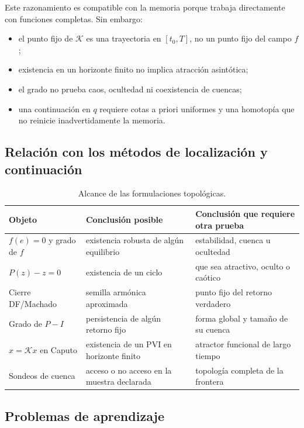 Este razonamiento es compatible con la memoria porque trabaja directamente
con funciones completas. Sin embargo:

\begin{itemize}
 \item el punto fijo de $\mathcal K$ es una trayectoria en $[t_0,T]$, no un
 punto fijo del campo $f$;
 \item existencia en un horizonte finito no implica atracción asintótica;
 \item el grado no prueba caos, ocultedad ni coexistencia de cuencas;
 \item una continuación en $q$ requiere cotas a priori uniformes y una
 homotopía que no reinicie inadvertidamente la memoria.
\end{itemize}

\subsection{Relación con los métodos de localización y continuación}

\begin{table}[H]
\centering
\caption{Alcance de las formulaciones topológicas.}
\label{tab:topological-method-boundary}
\small
\begin{tabularx}{\textwidth}{@{}L{3.0cm}YY@{}}
\toprule
Objeto & Conclusión posible & Conclusión que requiere otra prueba \\
\midrule
$f(e)=0$ y grado de $f$ & existencia robusta de algún equilibrio & estabilidad, cuenca u ocultedad \\
$P(z)-z=0$ & existencia de un ciclo & que sea atractivo, oculto o caótico \\
Cierre DF/Machado & semilla armónica aproximada & punto fijo del retorno verdadero \\
Grado de $P-I$ & persistencia de algún retorno fijo & forma global y tamaño de su cuenca \\
$x=\mathcal Kx$ en Caputo & existencia de un PVI en horizonte finito & atractor funcional de largo tiempo \\
Sondeos de cuenca & acceso o no acceso en la muestra declarada & topología completa de la frontera \\
\bottomrule
\end{tabularx}
\end{table}

\ifHAFOPedagogy
\subsection{Problemas de aprendizaje}

